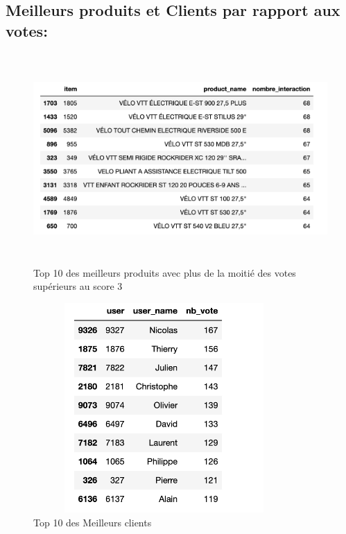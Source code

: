 \subsection{Meilleurs produits et Clients par rapport aux votes:}
\begin{figure}[h]
\begin{center}
\includegraphics[width=15cm,height=8cm]{images/top_10_products.png}
\caption[Top 10 des meilleurs produits avec plus de la moitié des votes supérieurs au score 3]{Top 10 des meilleurs produits avec plus de la moitié des votes supérieurs au score 3}
\label{monlabel}
\end{center}
\end{figure}

\begin{figure}[h]
\begin{center}
\includegraphics[width=10cm,height=8cm]{images/top10_users.png}
\caption[Top 10 des Meilleurs clients]{Top 10 des Meilleurs clients}
\label{monlabel}
\end{center}
\end{figure}


